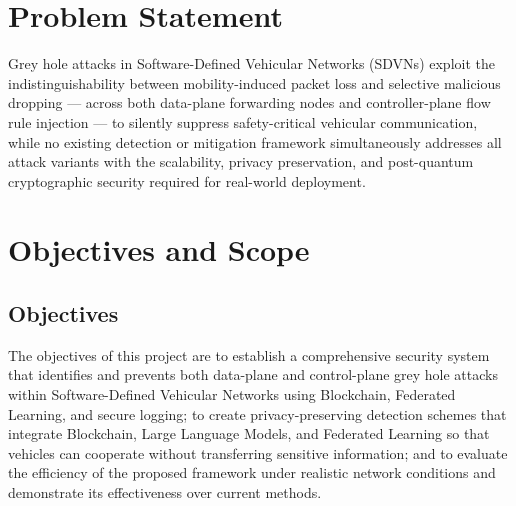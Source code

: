 \documentclass[12pt, a4paper]{report}
\begin{document}
\section{Problem Statement}

Grey hole attacks in Software-Defined Vehicular Networks (SDVNs) exploit the
indistinguishability between mobility-induced packet loss and selective malicious dropping — across both data-plane forwarding nodes and controller-plane flow rule injection — to silently suppress safety-critical vehicular communication, while no existing detection or mitigation framework simultaneously addresses all attack variants with the scalability, privacy preservation, and post-quantum cryptographic security required for real-world deployment.

\section{Objectives and Scope}

\subsection{Objectives}

The objectives of this project are to establish a comprehensive security system that identifies and prevents both data-plane and control-plane grey hole attacks within Software-Defined Vehicular Networks using Blockchain, Federated Learning, and secure logging; to create privacy-preserving detection schemes that integrate Blockchain, Large Language Models, and Federated Learning so that vehicles can cooperate without transferring sensitive information; and to evaluate the efficiency of the proposed framework under realistic network conditions and demonstrate its effectiveness over current methods.
\end{document}
